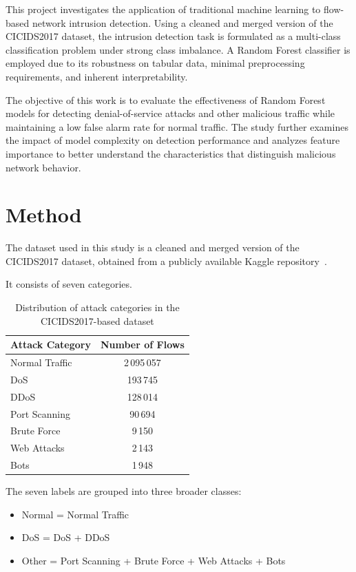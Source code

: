 \documentclass[conference]{IEEEtran}
\begin{document}
This project investigates the application of traditional machine learning to flow-based network intrusion detection. Using a cleaned and merged version of the CICIDS2017 dataset, the intrusion detection task is formulated as a multi-class classification problem under strong class imbalance. A Random Forest classifier is employed due to its robustness on tabular data, minimal preprocessing requirements, and inherent interpretability.

The objective of this work is to evaluate the effectiveness of Random Forest models for detecting denial-of-service attacks and other malicious traffic while maintaining a low false alarm rate for normal traffic. The study further examines the impact of model complexity on detection performance and analyzes feature importance to better understand the characteristics that distinguish malicious network behavior.

 \section{Method}

The dataset used in this study is a cleaned and merged version of the CICIDS2017 dataset, obtained from a publicly available Kaggle repository~\cite{cicids2017_kaggle}.

It consists of seven categories.
\begin{table}[h]
\centering
\caption{Distribution of attack categories in the CICIDS2017-based dataset}
\label{tab:attack_distribution}
\begin{tabular}{lc}
\toprule
Attack Category & Number of Flows \\
\midrule
Normal Traffic & 2\,095\,057 \\
DoS            & 193\,745 \\
DDoS           & 128\,014 \\
Port Scanning  & 90\,694 \\
Brute Force    & 9\,150 \\
Web Attacks    & 2\,143 \\
Bots           & 1\,948 \\
\bottomrule
\end{tabular}
\end{table}


The seven labels are grouped into three broader classes:
\begin{itemize}
    \item Normal = Normal Traffic
    \item DoS = DoS + DDoS
    \item Other = Port Scanning + Brute Force + Web Attacks + Bots
\end{itemize}
\end{document}
